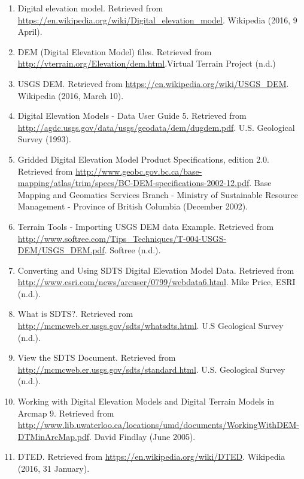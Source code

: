 \documentclass[11pt]{article}
\begin{document}
\begin{enumerate}[{(1)}]

\item Digital elevation model. Retrieved from \url{https://en.wikipedia.org/wiki/Digital_elevation_model}. Wikipedia (2016, 9 April).

\item DEM (Digital Elevation Model) files. Retrieved from \url{http://vterrain.org/Elevation/dem.html}.Virtual Terrain Project (n.d.)

\item USGS DEM. Retrieved from \url{https://en.wikipedia.org/wiki/USGS_DEM}. Wikipedia (2016, March 10).

\item Digital Elevation Models - Data User Guide 5. Retrieved from \url{http://agdc.usgs.gov/data/usgs/geodata/dem/dugdem.pdf}. U.S. Geological Survey (1993).

\item Gridded Digital Elevation Model Product Specifications, edition 2.0. Retrieved from \url{http://www.geobc.gov.bc.ca/base-mapping/atlas/trim/specs/BC-DEM-specifications-2002-12.pdf}. Base Mapping and Geomatics Services Branch - Ministry of Sustainable Resource Management - Province of British Columbia (December 2002).

\item Terrain Tools - Importing USGS DEM data Example. Retrieved from \url{http://www.softree.com/Tips_Techniques/T-004-USGS-DEM/USGS_DEM.pdf}. Softree (n.d.).

\item Converting and Using SDTS Digital Elevation Model Data. Retrieved from \url{http://www.esri.com/news/arcuser/0799/webdata6.html}. Mike Price, ESRI (n.d.). 

\item What is SDTS?. Retrieved rom \url{http://mcmcweb.er.usgs.gov/sdts/whatsdts.html}. U.S Geological Survey (n.d.). 

\item 
View the SDTS Document. Retrieved from \url{http://mcmcweb.er.usgs.gov/sdts/standard.html}. U.S. Geological Survey (n.d.).

\item Working with Digital Elevation Models and Digital Terrain Models in Arcmap 9. Retrieved from \url{http://www.lib.uwaterloo.ca/locations/umd/documents/WorkingWithDEM-DTMinArcMap.pdf}. David Findlay (June 2005).

\item DTED. Retrieved from \url{https://en.wikipedia.org/wiki/DTED}. Wikipedia (2016, 31 January).


\end{enumerate}
\end{document}
